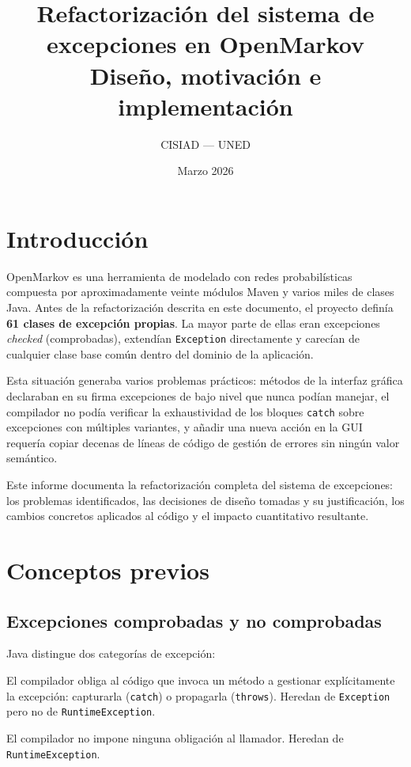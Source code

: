 \documentclass[12pt,a4paper]{article}
\title{\textbf{Refactorización del sistema de excepciones en OpenMarkov}\\[0.5em]
\large Diseño, motivación e implementación}
\author{CISIAD --- UNED}
\date{Marzo 2026}
\begin{document}
\maketitle
\tableofcontents
\newpage

\section{Introducción}
\label{sec:intro}

OpenMarkov es una herramienta de modelado con redes probabilísticas compuesta
por aproximadamente veinte módulos Maven y varios miles de clases Java.
Antes de la refactorización descrita en este documento, el proyecto definía
\textbf{61 clases de excepción propias}. La mayor parte de ellas eran excepciones
\emph{checked} (comprobadas), extendían \texttt{Exception} directamente y
carecían de cualquier clase base común dentro del dominio de la aplicación.

Esta situación generaba varios problemas prácticos: métodos de la interfaz gráfica
declaraban en su firma excepciones de bajo nivel que nunca podían manejar, el
compilador no podía verificar la exhaustividad de los bloques \texttt{catch} sobre
excepciones con múltiples variantes, y añadir una nueva acción en la GUI requería
copiar decenas de líneas de código de gestión de errores sin ningún valor
semántico.

Este informe documenta la refactorización completa del sistema de excepciones:
los problemas identificados, las decisiones de diseño tomadas y su justificación,
los cambios concretos aplicados al código y el impacto cuantitativo resultante.

\section{Conceptos previos}
\label{sec:conceptos}

\subsection{Excepciones comprobadas y no comprobadas}
\label{sec:checked-unchecked}

Java distingue dos categorías de excepción:

\begin{description}[leftmargin=2em]
  \item[Comprobada (\textit{checked})] El compilador obliga al código que invoca
    un método a gestionar explícitamente la excepción: capturarla (\texttt{catch})
    o propagarla (\texttt{throws}). Heredan de \texttt{Exception} pero no de
    \texttt{RuntimeException}.
  \item[No comprobada (\textit{unchecked})] El compilador no impone ninguna
    obligación al llamador. Heredan de \texttt{RuntimeException}.
\end{description}
\end{document}
